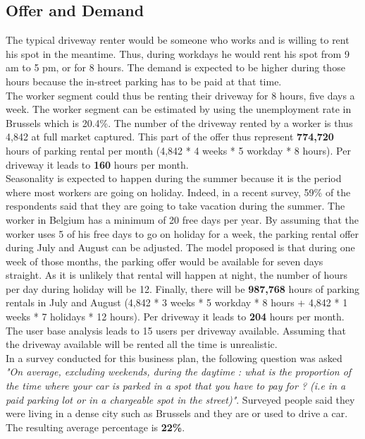\documentclass[12pt,a4paper,oneside]{book}
\begin{document}
\subsection{Offer and Demand}

The typical driveway renter would be someone who works and is willing to rent his spot in the meantime. Thus, during workdays he would rent his spot from 9 am to 5 pm, or for 8 hours. The demand is expected to be higher during those hours because the in-street parking has to be paid at that time.\\

The worker segment could thus be renting their driveway for 8 hours, five days a week. The worker segment can be estimated by using the unemployment rate in Brussels which is 20.4\%.\cite{unemploybx} The number of the driveway rented by a worker is thus 4,842 at full market captured. This part of the offer thus represent \textbf{774,720} hours of parking rental per month (4,842 * 4 weeks * 5 workday * 8 hours). Per driveway it leads to \textbf{160} hours per month.\\

Seasonality is expected to happen during the summer because it is the period where most workers are going on holiday. Indeed, in a recent survey, 59\% of the respondents said that they are going to take vacation during the summer.\cite{hdws} The worker in Belgium has a minimum of 20 free days per year.\cite{hdbe} By assuming that the worker uses 5 of his free days to go on holiday for a week, the parking rental offer during July and August can be adjusted. The model proposed is that during one week of those months, the parking offer would be available for seven days straight. As it is unlikely that rental will happen at night, the number of hours per day during holiday will be 12. Finally, there will be \textbf{987,768} hours of parking rentals in July and August (4,842 * 3 weeks * 5 workday * 8 hours + 4,842 * 1 weeks * 7 holidays * 12 hours). Per driveway it leads to \textbf{204} hours per month.\\

The user base analysis leads to 15 users per driveway available. Assuming that the driveway available will be rented all the time is unrealistic.\\

In a survey conducted for this business plan, the following question was asked \textit{"On average, excluding weekends, during the daytime : what is the proportion of the time where your car is parked in a spot that you have to pay for ? (i.e in a paid parking lot or in a chargeable spot in the street)"}. Surveyed people said they were living in a dense city such as Brussels and they are or used to drive a car. The resulting average percentage is \textbf{22\%}.\\
\end{document}
